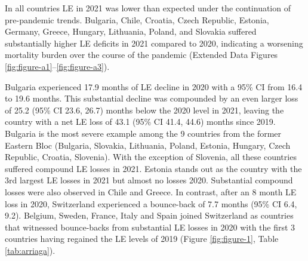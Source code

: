 \documentclass[12pt]{article}
\begin{document}
In all countries LE in 2021 was lower than expected under the continuation of pre-pandemic trends. Bulgaria, Chile, Croatia, Czech Republic, Estonia, Germany, Greece, Hungary, Lithuania, Poland, and Slovakia suffered substantially higher LE deficits in 2021 compared to 2020, indicating a worsening mortality burden over the course of the pandemic (Extended Data Figures \ref{fig:figure-a1}--\ref{fig:figure-a3}).

Bulgaria experienced 17.9 months of LE decline in 2020 with a 95\% CI from 16.4 to 19.6 months. This substantial decline was compounded by an even larger loss of 25.2 (95\% CI 23.6, 26.7) months below the 2020 level in 2021, leaving the country with a net LE loss of 43.1 (95\% CI 41.4, 44.6) months since 2019. Bulgaria is the most severe example among the 9 countries from the former Eastern Bloc (Bulgaria, Slovakia, Lithuania, Poland, Estonia, Hungary, Czech Republic, Croatia, Slovenia). With the exception of Slovenia, all these countries suffered compound LE losses in 2021. Estonia stands out as the country with the 3rd largest LE losses in 2021 but almost no losses 2020. Substantial compound losses were also observed in Chile and Greece. In contrast, after an 8 month LE loss in 2020, Switzerland experienced a bounce-back of 7.7 months (95\% CI 6.4, 9.2). Belgium, Sweden, France, Italy and Spain joined Switzerland as countries that witnessed bounce-backs from substantial LE losses in 2020 with the first 3 countries having regained the LE levels of 2019 (Figure \ref{fig:figure-1}, Table \ref{tab:arriaga}).
\end{document}

